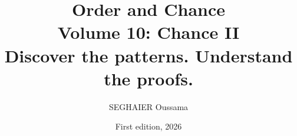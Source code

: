\documentclass[11pt,openany]{book}
\title{\Huge\textbf{Order and Chance}\\[0.4em]\LARGE Volume 10: Chance II\\[0.6em]
\Large Discover the patterns. Understand the proofs.}
\author{SEGHAIER Oussama}
\date{First edition, 2026}
\begin{document}
\frontmatter
\makecover
\maketitle

\tableofcontents

\mainmatter














\end{document}
